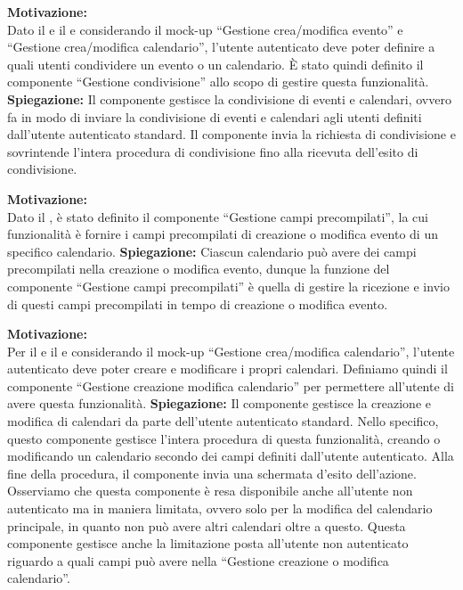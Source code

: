 \begin{listaPersonale}[ACI]{}

    \textbf{Motivazione:}\\
    Dato il  e il  e considerando il mock-up  “Gestione crea/modifica evento” e  “Gestione crea/modifica calendario”, l'utente autenticato deve poter definire a quali utenti condividere un evento o un calendario. È stato quindi definito il componente “Gestione condivisione” allo scopo di gestire questa funzionalità.
    \textbf{Spiegazione:} Il componente gestisce la condivisione di eventi e calendari, ovvero fa in modo di inviare la condivisione di eventi e calendari agli utenti definiti dall'utente autenticato standard. Il componente invia la richiesta di condivisione e sovrintende l'intera procedura di condivisione fino alla ricevuta dell'esito di condivisione.



    \textbf{Motivazione:}\\
    Dato il , è stato definito il componente “Gestione campi precompilati”, la cui funzionalità è fornire i campi precompilati di creazione o modifica evento di un specifico calendario.
    \textbf{Spiegazione:} Ciascun calendario può avere dei campi precompilati nella creazione o modifica evento, dunque la funzione del componente “Gestione campi precompilati” è quella di gestire la ricezione e invio di questi campi precompilati in tempo di creazione o modifica evento.



    \textbf{Motivazione:}\\
    Per il  e il  e considerando il mock-up  “Gestione crea/modifica calendario”, l'utente autenticato deve poter creare e modificare i propri calendari.
    Definiamo quindi il componente “Gestione creazione modifica calendario” per permettere all'utente di avere questa funzionalità.
    \textbf{Spiegazione:} Il componente gestisce la creazione e modifica di calendari da parte dell'utente autenticato standard. Nello specifico, questo componente gestisce l'intera procedura di questa funzionalità, creando o modificando un calendario secondo dei campi definiti dall'utente autenticato. Alla fine della procedura, il componente invia una schermata d'esito dell'azione.\\
    Osserviamo che questa componente è resa disponibile anche all'utente non autenticato ma in maniera limitata, ovvero solo per la modifica del calendario principale, in quanto non può avere altri calendari oltre a questo. Questa componente gestisce anche la limitazione posta all'utente non autenticato riguardo a quali campi può avere nella “Gestione creazione o modifica calendario”.



\end{listaPersonale}
